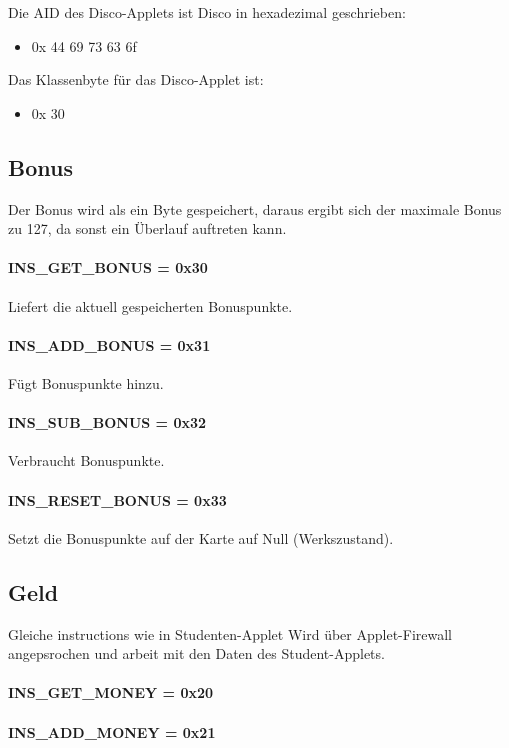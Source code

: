Die AID des Disco-Applets ist Disco in hexadezimal geschrieben:
\begin{itemize}
	\item 0x 44 69 73 63 6f
\end{itemize}
Das Klassenbyte für das Disco-Applet ist:
\begin{itemize}
	\item 0x 30
\end{itemize}

\subsection{Bonus}
Der Bonus wird als ein Byte gespeichert, daraus ergibt sich der maximale Bonus zu 127, da sonst ein Überlauf auftreten kann.

\paragraph{INS\_GET\_BONUS = 0x30}
Liefert die aktuell gespeicherten Bonuspunkte.

\paragraph{INS\_ADD\_BONUS = 0x31}
Fügt Bonuspunkte hinzu.

\paragraph{INS\_SUB\_BONUS = 0x32}
Verbraucht Bonuspunkte.

\paragraph{INS\_RESET\_BONUS = 0x33}
Setzt die Bonuspunkte auf der Karte auf Null (Werkszustand).

\subsection{Geld}
Gleiche instructions wie in Studenten-Applet
Wird über Applet-Firewall angepsrochen und arbeit mit den Daten des Student-Applets.

\paragraph{INS\_GET\_MONEY = 0x20}
\paragraph{INS\_ADD\_MONEY = 0x21}
